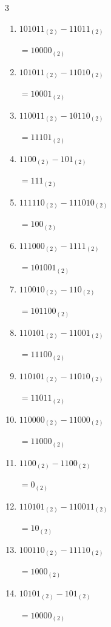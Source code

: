 \begin{multicols}{3}
\begin{enumerate}
        $=10101_{(2)}$

  \item $101011_{(2)} - 11011_{(2)}$

        $=10000_{(2)}$

  \item $101011_{(2)} - 11010_{(2)}$

        $=10001_{(2)}$

  \item $110011_{(2)} - 10110_{(2)}$

        $=11101_{(2)}$

  \item $1100_{(2)} - 101_{(2)}$

        $=111_{(2)}$

  \item $111110_{(2)} - 111010_{(2)}$

        $=100_{(2)}$

  \item $111000_{(2)} - 1111_{(2)}$

        $=101001_{(2)}$

\columnbreak %

  \item $110010_{(2)} - 110_{(2)}$

        $=101100_{(2)}$

  \item $110101_{(2)} - 11001_{(2)}$

        $=11100_{(2)}$

  \item $110101_{(2)} - 11010_{(2)}$

        $=11011_{(2)}$

  \item $110000_{(2)} - 11000_{(2)}$

        $=11000_{(2)}$

  \item $1100_{(2)} - 1100_{(2)}$

        $=0_{(2)}$

  \item $110101_{(2)} - 110011_{(2)}$

        $=10_{(2)}$

  \item $100110_{(2)} - 11110_{(2)}$

        $=1000_{(2)}$

  \item $10101_{(2)} - 101_{(2)}$

        $=10000_{(2)}$


\end{enumerate}
\end{multicols}
